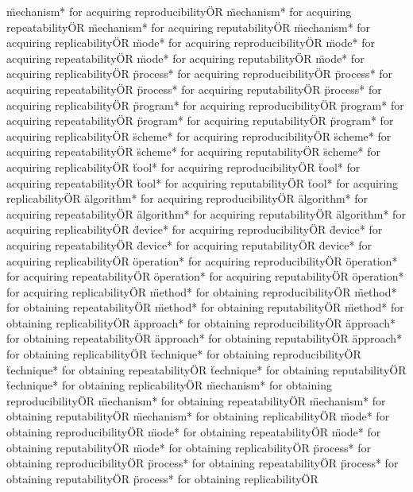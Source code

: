 \documentclass[
10pt, %
a4paper, %
oneside, %
headinclude,footinclude, %
BCOR5mm, %
]{scrartcl}
\begin{document}
\"mechanism* for acquiring reproducibility\" OR \"mechanism* for acquiring repeatability\" OR \"mechanism* for acquiring reputability\" OR \"mechanism* for acquiring replicability\" OR 
\"mode* for acquiring reproducibility\" OR \"mode* for acquiring repeatability\" OR \"mode* for acquiring reputability\" OR \"mode* for acquiring replicability\" OR 
\"process* for acquiring reproducibility\" OR \"process* for acquiring repeatability\" OR \"process* for acquiring reputability\" OR \"process* for acquiring replicability\" OR 
\"program* for acquiring reproducibility\" OR \"program* for acquiring repeatability\" OR \"program* for acquiring reputability\" OR \"program* for acquiring replicability\" OR 
\"scheme* for acquiring reproducibility\" OR \"scheme* for acquiring repeatability\" OR \"scheme* for acquiring reputability\" OR \"scheme* for acquiring replicability\" OR 
\"tool* for acquiring reproducibility\" OR \"tool* for acquiring repeatability\" OR \"tool* for acquiring reputability\" OR \"tool* for acquiring replicability\" OR 
\"algorithm* for acquiring reproducibility\" OR \"algorithm* for acquiring repeatability\" OR \"algorithm* for acquiring reputability\" OR \"algorithm* for acquiring replicability\" OR 
\"device* for acquiring reproducibility\" OR \"device* for acquiring repeatability\" OR \"device* for acquiring reputability\" OR \"device* for acquiring replicability\" OR 
\"operation* for acquiring reproducibility\" OR \"operation* for acquiring repeatability\" OR \"operation* for acquiring reputability\" OR \"operation* for acquiring replicability\" OR 
\"method* for obtaining reproducibility\" OR \"method* for obtaining repeatability\" OR \"method* for obtaining reputability\" OR \"method* for obtaining replicability\" OR 
\"approach* for obtaining reproducibility\" OR \"approach* for obtaining repeatability\" OR \"approach* for obtaining reputability\" OR \"approach* for obtaining replicability\" OR 
\"technique* for obtaining reproducibility\" OR \"technique* for obtaining repeatability\" OR \"technique* for obtaining reputability\" OR \"technique* for obtaining replicability\" OR 
\"mechanism* for obtaining reproducibility\" OR \"mechanism* for obtaining repeatability\" OR \"mechanism* for obtaining reputability\" OR \"mechanism* for obtaining replicability\" OR 
\"mode* for obtaining reproducibility\" OR \"mode* for obtaining repeatability\" OR \"mode* for obtaining reputability\" OR \"mode* for obtaining replicability\" OR 
\"process* for obtaining reproducibility\" OR \"process* for obtaining repeatability\" OR \"process* for obtaining reputability\" OR \"process* for obtaining replicability\" OR 
\end{document}
